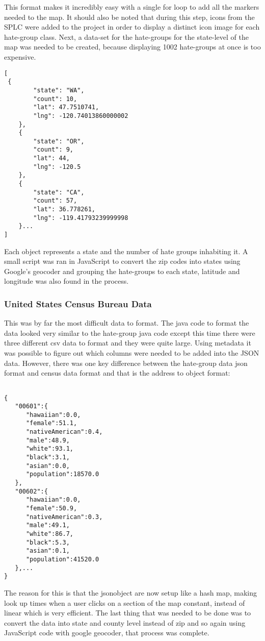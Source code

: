 \documentclass[twoside]{article}
\begin{document}
\begin{multicols}{2}
This format makes it incredibly easy with a single for loop to add all the markers needed to the map. It should also be noted that during this step, icons from the SPLC were added to the project in order to display a distinct icon image for each hate-group class. Next, a data-set for the hate-groups for the state-level of the map was needed to be created, because displaying 1002 hate-groups at once is too expensive.

\begin{verbatim}
[ 
 {
        "state": "WA",
        "count": 10,
        "lat": 47.7510741,
        "lng": -120.74013860000002
    },
    {
        "state": "OR",
        "count": 9,
        "lat": 44,
        "lng": -120.5
    },
    {
        "state": "CA",
        "count": 57,
        "lat": 36.778261,
        "lng": -119.41793239999998
    }...
]
\end{verbatim}
Each object represents a state and the number of hate groups inhabiting it. A small script was ran in JavaScript to convert the zip codes into states using  Google’s geocoder and grouping the hate-groups to each state, latitude and longitude was also found in the process.

\subsubsection{United States Census Bureau Data}

This was by far the most difficult data to format. The java code to format the data looked very similar to the hate-group java code except this time 
there were three different csv data to format and they were quite large. Using metadata it was possible to figure out which columns were needed to be added into the JSON data. However, there was one key difference between the hate-group data json format and census data format and that is the address to object format:
\begin{verbatim}

{  
   "00601":{  
      "hawaiian":0.0,
      "female":51.1,
      "nativeAmerican":0.4,
      "male":48.9,
      "white":93.1,
      "black":3.1,
      "asian":0.0,
      "population":18570.0
   },
   "00602":{  
      "hawaiian":0.0,
      "female":50.9,
      "nativeAmerican":0.3,
      "male":49.1,
      "white":86.7,
      "black":5.3,
      "asian":0.1,
      "population":41520.0
   },...
}
\end{verbatim}
The reason for this is that the jsonobject are now setup like a hash map, making look up times when a user clicks on a section of the map constant, instead of linear which is very efficient. 
The last thing that was needed to be done was to convert the data into state and county level instead of zip and so again using JavaScript code with google geocoder, that process was complete. 


\end{multicols}
\end{document}

